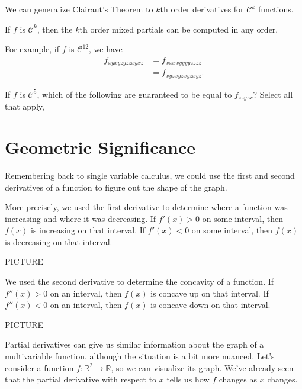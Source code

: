 \documentclass{ximera}
\begin{document}
We can generalize Clairaut's Theorem to $k$th order derivatives for $\mathcal{C}^k$ functions.

\begin{theorem}
If $f$ is $\mathcal{C}^k$, then the $k$th order mixed partials can be computed in any order.
\end{theorem}

For example, if $f$ is $\mathcal{C}^{12}$, we have
\begin{align*}
f_{xyxyzyzzxyxz}&=f_{xxxxyyyyzzzz}\\
&=f_{xyzxyzxyzxyz}.
\end{align*}

\begin{problem}
If $f$ is $\mathcal{C}^5$, which of the following are guaranteed to be equal to $f_{zzyzx}$? Select all that apply,
\begin{selectAll}
\end{selectAll}
\end{problem}

\section*{Geometric Significance}

Remembering back to single variable calculus, we could use the first and second derivatives of a function to figure out the shape of the graph.

More precisely, we used the first derivative to determine where a function was increasing and where it was decreasing. If $f'(x)>0$ on some interval, then $f(x)$ is increasing on that interval. If $f'(x)<0$ on some interval, then $f(x)$ is decreasing on that interval.

PICTURE

We used the second derivative to determine the concavity of a function. If $f''(x)>0$ on an interval, then $f(x)$ is concave up on that interval. If $f''(x)<0$ on an interval, then $f(x)$ is concave down on that interval.

PICTURE

Partial derivatives can give us similar information about the graph of a multivariable function, although the situation is a bit more nuanced. Let's consider a function $f:\mathbb{R}^2\rightarrow\mathbb{R}$, so we can visualize its graph. We've already seen that the partial derivative with respect to $x$ tells us how $f$ changes as $x$ changes.
\end{document}
